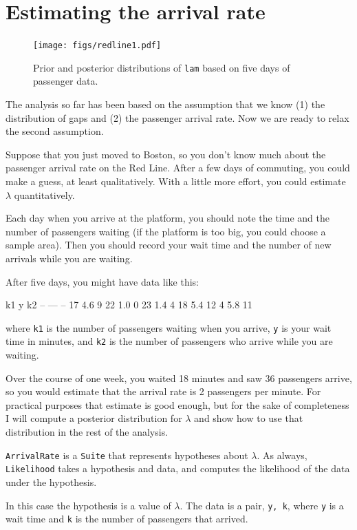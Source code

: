 \documentclass[12pt]{book}
\theoremstyle{exercise}
\begin{document}
\section{Estimating the arrival rate}

\begin{figure}
\centerline{\texttt{[image: figs/redline1.pdf]}}
\caption{Prior and posterior distributions of {\tt lam} based
on five days of passenger data. }
\label{fig.redline1}
\end{figure}

The analysis so far has been based on the assumption that we know (1)
the distribution of gaps and (2) the passenger arrival rate.  Now we
are ready to relax the second assumption.

Suppose that you just moved to Boston, so you don't know much about
the passenger arrival rate on the Red Line.  After a few days of
commuting, you could make a guess, at least qualitatively.  With
a little more effort, you could estimate $\lambda$ quantitatively.

Each day when you arrive at the platform, you should note the
time and the number of passengers waiting (if the platform is too
big, you could choose a sample area).  Then you should record your
wait time and the
number of new arrivals while you are waiting.

After five days, you might have data like this:
%
\begin{code}
k1      y     k2
--     ---    --
17     4.6     9
22     1.0     0
23     1.4     4
18     5.4    12
4      5.8    11
\end{code}
%
where {\tt k1} is the number of passengers waiting when you arrive,
{\tt y} is your wait time in minutes, and {\tt k2} is the number of
passengers who arrive while you are waiting.

Over the course of one week, you waited 18 minutes and saw 36
passengers arrive, so you would estimate that the arrival rate is
2 passengers per minute.  For practical purposes that estimate is
good enough, but for the sake of completeness I
will compute a posterior distribution for $\lambda$ and show how
to use that distribution in the rest of the analysis.

{\tt ArrivalRate} is a {\tt Suite} that represents hypotheses about
$\lambda$.  As always, {\tt Likelihood} takes a hypothesis and data,
and computes the likelihood of the data under the hypothesis.

In this case the hypothesis is a value of $\lambda$.  The data is a
pair, {\tt y, k}, where {\tt y} is a wait time and {\tt k} is the
number of passengers that arrived.
\end{document}
